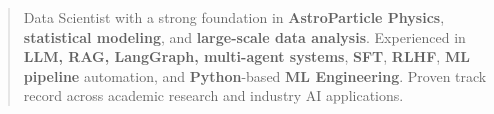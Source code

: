 \documentclass[10pt,a4paper,ragged2e,withhyper]{altacv}
\begin{document}


\makecvheader


\begin{quote}
Data Scientist with a strong foundation in {\bf AstroParticle Physics}, {\bf statistical modeling}, and {\bf large-scale data analysis}. Experienced in {\bf LLM, {\bf RAG}, {\bf LangGraph}, multi-agent systems}, {\bf SFT}, {\bf RLHF}, {\bf ML pipeline} automation, and {\bf Python}-based {\bf ML Engineering}. Proven track record across academic research and industry AI applications.
\end{quote}
\end{document}

